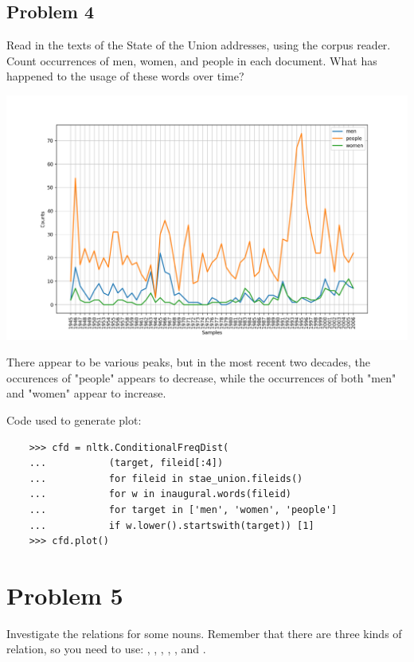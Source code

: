 \documentclass[12pt]{article}
\begin{document}
	\subsection*{Problem 4} Read in the texts of the State of the Union addresses, using the  corpus reader. Count occurrences of men, women, and people in each document. What has happened to the usage of these words over time?
	
	\includegraphics[width=\textwidth]{Figure_1.png}
	
	There appear to be various peaks, but in the most recent two decades, the occurences of "people" appears to decrease, while the occurrences of both "men" and "women" appear to increase.
	
	Code used to generate plot:
	\begin{lstlisting}
	>>> cfd = nltk.ConditionalFreqDist(
	...           (target, fileid[:4])
	...           for fileid in stae_union.fileids()
	...           for w in inaugural.words(fileid)
	...           for target in ['men', 'women', 'people']
	...           if w.lower().startswith(target)) [1]
	>>> cfd.plot()
	\end{lstlisting}
	
\section*{Problem 5} Investigate the  relations for some nouns. Remember that there are three kinds of  relation, so you need to use: , , 
	, , , and .
	
\end{document}
